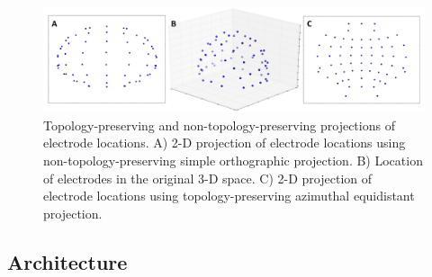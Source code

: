 \documentclass{article}
\begin{document}
\begin{figure}[h]
    \centering
    \includegraphics[width=\textwidth]{azim_proj_eeg.png}
    \caption{Topology-preserving and non-topology-preserving projections of electrode locations. A) 2-D projection of electrode locations using non-topology-preserving simple orthographic projection. B) Location of electrodes in the original 3-D space. C) 2-D projection of electrode locations using topology-preserving azimuthal equidistant projection.}
    \label{fig:azim_proj_eeg}
\end{figure}


\subsection{Architecture}

\printbibliography


%
%
\end{document}

